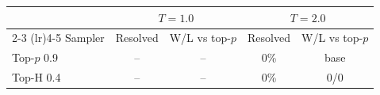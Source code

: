 \begin{tabular}{lcccc}
\toprule
 & \multicolumn{2}{c}{$T{=}1.0$} & \multicolumn{2}{c}{$T{=}2.0$} \\
\cmidrule(lr){2-3} \cmidrule(lr){4-5}
Sampler & Resolved & W/L vs top-$p$ & Resolved & W/L vs top-$p$ \\
\midrule
Top-$p$ 0.9 & -- & -- & 0\% & base \\
Top-H 0.4 & -- & -- & 0\% & 0/0 \\
\bottomrule
\end{tabular}
